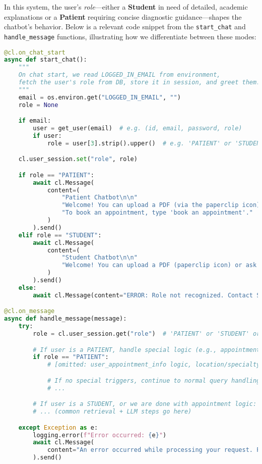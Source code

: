 In this system, the user’s \emph{role}—either a \textbf{Student} in need of detailed, academic explanations or a \textbf{Patient} requiring concise diagnostic guidance—shapes the chatbot’s behavior. Below is a relevant code snippet from the \texttt{start\_chat} and \texttt{handle\_message} functions, illustrating how we differentiate between these modes:

\begin{lstlisting}[language=Python, caption={Role-Based Logic Snippet}, basicstyle=\small\ttfamily]
@cl.on_chat_start
async def start_chat():
    """
    On chat start, we read LOGGED_IN_EMAIL from environment,
    fetch the user's role from DB, store it in session, and greet them.
    """
    email = os.environ.get("LOGGED_IN_EMAIL", "")
    role = None

    if email:
        user = get_user(email)  # e.g. (id, email, password, role)
        if user:
            role = user[3].strip().upper()  # e.g. 'PATIENT' or 'STUDENT'

    cl.user_session.set("role", role)

    if role == "PATIENT":
        await cl.Message(
            content=(
                "Patient Chatbot\n\n"
                "Welcome! You can upload a PDF (via the paperclip icon) or ask a biomedical question. "
                "To book an appointment, type 'book an appointment'."
            )
        ).send()
    elif role == "STUDENT":
        await cl.Message(
            content=(
                "Student Chatbot\n\n"
                "Welcome! You can upload a PDF (paperclip icon) or ask a biomedical question to get started."
            )
        ).send()
    else:
        await cl.Message(content="ERROR: Role not recognized. Contact Support.").send()

@cl.on_message
async def handle_message(message):
    try:
        role = cl.user_session.get("role")  # 'PATIENT' or 'STUDENT' or None

        # If user is a PATIENT, handle special logic (e.g., appointment booking)
        if role == "PATIENT":
            # [omitted: user_appointment_info logic, location/specialty checks, etc.]

            # If no special triggers, continue to normal query handling
            # ...

        # If user is a STUDENT, or we are done with appointment logic:
        # ... (common retrieval + LLM steps go here)

    except Exception as e:
        logging.error(f"Error occurred: {e}")
        await cl.Message(
            content="An error occurred while processing your request. Please try again."
        ).send()
\end{lstlisting}

